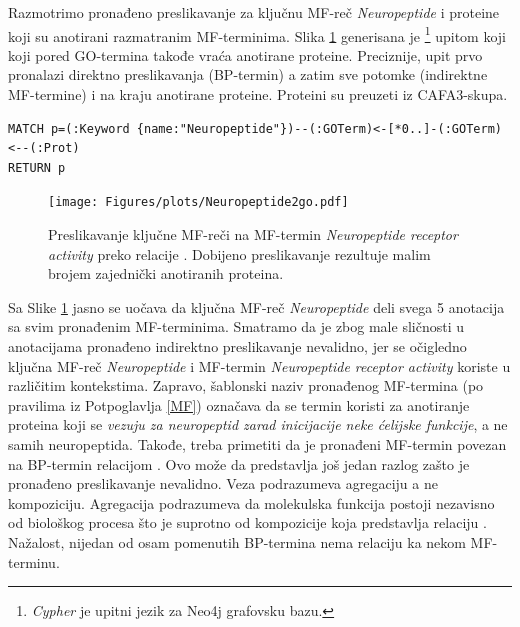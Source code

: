 Razmotrimo pronađeno preslikavanje za ključnu MF-reč  \textit{Neuropeptide} i
proteine koji su anotirani razmatranim MF-terminima. Slika \ref{fig:neuropeptide}
generisana je \footnote{\textit{Cypher} je upitni jezik za
Neo4j grafovsku bazu.} upitom koji koji pored GO-termina takođe vraća anotirane
proteine. Preciznije, upit prvo pronalazi direktno preslikavanja (BP-termin)  a
zatim sve potomke (indirektne MF-termine) i na kraju anotirane proteine.
Proteini su preuzeti iz CAFA3-skupa. 

{ \fontsize{9}{9} 
\begin{verbatim}
MATCH p=(:Keyword {name:"Neuropeptide"})--(:GOTerm)<-[*0..]-(:GOTerm)<--(:Prot)
RETURN p
\end{verbatim}
}

\begin{figure}[!th]
\centering
\texttt{[image: Figures/plots/Neuropeptide2go.pdf]}
\caption {
  Preslikavanje ključne MF-reči   na MF-termin
  \textit{Neuropeptide receptor activity} preko relacije .
  Dobijeno preslikavanje rezultuje malim brojem zajednički anotiranih proteina.
}
\label{fig:neuropeptide}
\end{figure}

Sa Slike \ref{fig:neuropeptide} jasno se uočava da ključna MF-reč 
\textit{Neuropeptide} deli svega 5 anotacija sa svim pronađenim MF-terminima.
Smatramo da je zbog male sličnosti u anotacijama pronađeno indirektno
preslikavanje nevalidno, jer se očigledno ključna MF-reč  \textit{Neuropeptide} i
MF-termin \textit{Neuropeptide receptor activity} koriste u različitim
kontekstima. Zapravo, šablonski naziv pronađenog MF-termina (po pravilima iz
Potpoglavlja \ref{MF}) označava da se termin koristi za anotiranje proteina
koji se \textit{vezuju za neuropeptid zarad inicijacije neke ćelijske
funkcije}, a ne samih neuropeptida. Takođe, treba primetiti da je pronađeni MF-termin povezan na BP-termin relacijom .  Ovo može da
predstavlja još jedan razlog zašto je pronađeno preslikavanje nevalidno.  Veza
 podrazumeva agregaciju a ne kompoziciju. Agregacija
podrazumeva da  molekulska funkcija postoji nezavisno od biološkog procesa što
je suprotno od kompozicije koja predstavlja relaciju . Nažalost,
nijedan od osam pomenutih BP-termina nema relaciju  ka nekom MF-terminu.

\clearpage

